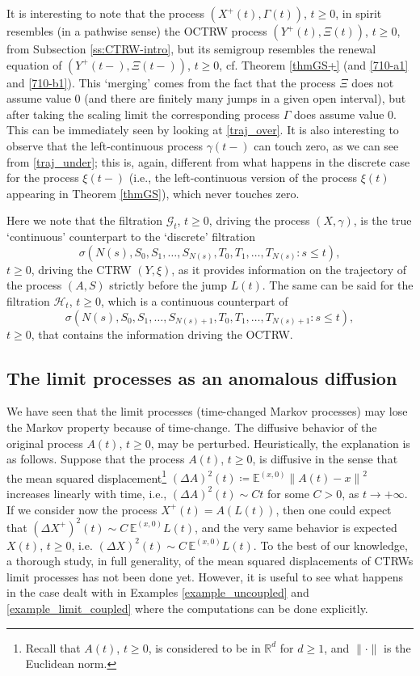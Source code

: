\documentclass[reqno]{amsart}
\theoremstyle{remark}
\numberwithin{equation}{section} %
\newcommand{\RR}{\mathbb{R}}
\newcommand{\1}{\mathds{1}}
\begin{document}
	It is interesting to note that the process $(X^+(t), \Gamma(t))$, $t \geq 0$, in spirit resembles (in a pathwise sense) the OCTRW process $(Y^+(t),\Xi(t))$, $t\ge0$, from Subsection \ref{ss:CTRW-intro}, but its semigroup resembles the renewal equation of $(Y^+(t-),\Xi(t-))$, $t\ge0$, cf. Theorem \ref{thmGS+} (and \eqref{710-a1} and \eqref{710-b1}). This `merging' comes from the fact that the process $\Xi$ does not assume value 0 (and there are finitely many jumps in a given open interval), but after taking the scaling limit the corresponding process $\Gamma$ does assume value 0. This can be immediately seen by looking at \eqref{traj_over}. It is also interesting to observe that the left-continuous process $\gamma(t-)$ can touch zero, as we can see from \eqref{traj_under}; this is, again, different from what happens in the discrete case for the process $\xi(t-)$ (i.e., the left-continuous version of the process $\xi(t)$ appearing in Theorem \ref{thmGS}), which never touches zero.
	
	Here we note that the filtration $\mathcal{G}_t$, $t\ge0$, driving the process $(X,\gamma)$, is the true `continuous' counterpart to the `discrete' filtration  \[\sigma(N(s),S_0,S_1,\dots,S_{N(s)},T_0,T_1,\dots,T_{N(s)}:s\le t),\]$t\ge0$, driving the CTRW $(Y,\xi)$, as it provides information on the trajectory of the process $(A,S)$ strictly before the jump $L(t)$. The same can be said for the filtration $\mathcal{H}_t$, $t\ge0$, which is a continuous counterpart of \[\sigma(N(s),S_0,S_1,\dots,S_{N(s)+1},T_0,T_1,\dots,T_{N(s)+1}:s\le t),\] $t\ge0$, that contains the information driving the OCTRW.
	
	
	
	
	\subsection{The limit processes as an anomalous diffusion}
	
	We have seen that the limit processes (time-changed Markov processes) may lose the Markov property because of time-change. The diffusive behavior of the original process $A(t)$, $t\ge0$, may be perturbed. Heuristically, the explanation is as follows. Suppose that the process $A(t)$, $t\ge0$, is diffusive in the sense that the mean squared displacement\footnote{Recall that $A(t)$, $t\ge0$, is considered to be in $\RR^d$ for $d\ge1$, and $\|\cdot\|$ is the Euclidean norm.} $(\Delta A )^2 (t) \coloneqq \mathds{E}^{(x,0)} \left\| A(t)-x \right\|^2$ increases linearly with time, i.e., $(\Delta A)^2(t) \sim Ct$ for some $C>0$, as $t \to +\infty$. If we consider now the process $X^+(t) = A(L(t))$, then one could expect that $(\Delta X^+)^2 (t) \sim C\,\mathds{E}^{(x,0)} L(t)$, and the very same behavior is expected  $X(t)$, $t\ge0$, i.e. $(\Delta X)^2 (t)\sim C\,\mathds{E}^{(x,0)} L(t)$. To the best of our knowledge, a thorough study, in full generality, of the mean squared displacements of CTRWs limit processes has not been done yet. However, it is useful to see what happens in the case dealt with in Examples \ref{example_uncoupled} and \ref{example_limit_coupled} where the computations can be done explicitly.
	
\end{document}
